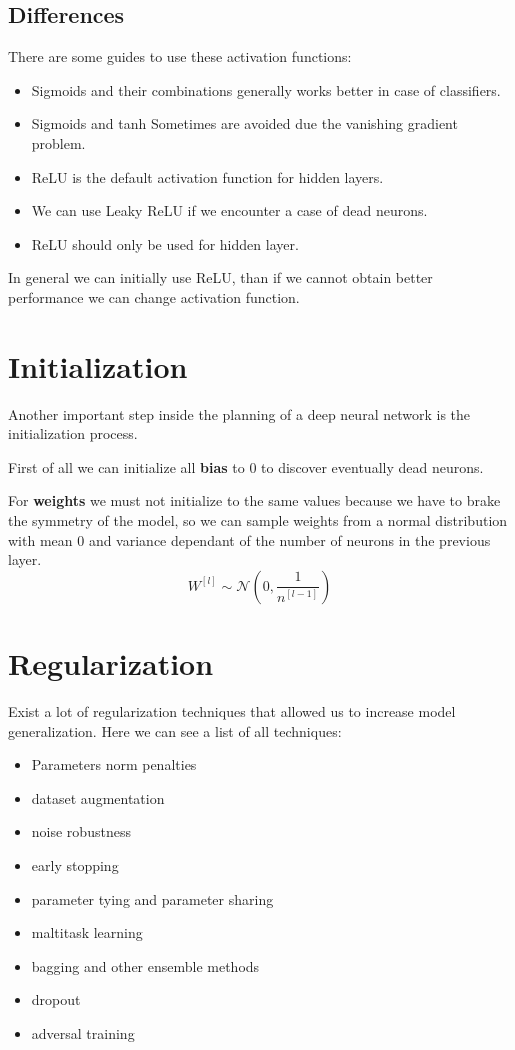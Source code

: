 \subsection{Differences}
There are some guides to use these activation functions:
\begin{itemize}
    \item Sigmoids and their combinations generally works better in case of classifiers.
    \item Sigmoids and tanh Sometimes are avoided due the vanishing gradient problem.
    \item ReLU is the default activation function for hidden layers.
    \item We can use Leaky ReLU if we encounter a case of dead neurons.
    \item ReLU should only be used for hidden layer.
\end{itemize}
In general we can initially use ReLU, than if we cannot obtain better performance
we can change activation function.

\section{Initialization}
Another important step inside the planning of a deep neural network is the 
initialization process.

First of all we can initialize all \textbf{bias} to $0$ to discover eventually 
dead neurons. %

For \textbf{weights} we must not initialize to the same values because we have to
brake the symmetry of the model, so we can sample weights from a normal 
distribution with mean $0$ and variance dependant of the number of neurons in 
the previous layer.
\begin{equation*}
    W^{[l]} \sim \mathcal{N}\left(0, \frac{1}{n^{[l-1]}}\right)
\end{equation*}

\section{Regularization}
Exist a lot of regularization techniques that allowed us to increase model generalization.
Here we can see a list of all techniques:
\begin{itemize}
    \item Parameters norm penalties
    \item dataset augmentation
    \item noise robustness
    \item early stopping
    \item parameter tying and parameter sharing
    \item maltitask learning
    \item bagging and other ensemble methods
    \item dropout
    \item adversal training
\end{itemize}

